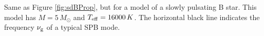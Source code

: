 \label{fig:SPBProp}
Same as Figure \ref{fig:sdBProp}, but for a model of a slowly pulsating B star. This model has $M=5 \, M_\odot$ and $T_{\rm eff} = 16000 \, K$. The horizontal black line indicates the frequency $\nu_{\rm g}$ of a typical SPB mode. 